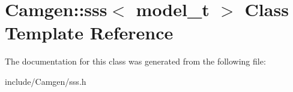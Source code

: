 \hypertarget{a00516}{}\section{Camgen\+:\+:sss$<$ model\+\_\+t $>$ Class Template Reference}
\label{a00516}


The documentation for this class was generated from the following file\+:\begin{DoxyCompactItemize}
\item 
include/\+Camgen/sss.\+h\end{DoxyCompactItemize}
